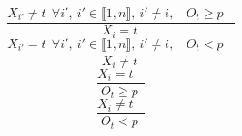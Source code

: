 $$\frac{X_{i'} \neq t~~\forall i',~i' \in \llbracket1,n\rrbracket,~i' \neq i,~~~~O_{t} \geq p~~~~}{X_{i}=t~}$$ $$\frac{X_{i'}=t~~\forall i',~i' \in \llbracket1,n\rrbracket,~i' \neq i,~~~~O_{t}<p~~~~}{X_{i} \neq t~}$$ $$\frac{X_{i}=t~~~~}{O_{t} \geq p~}$$ $$\frac{X_{i} \neq t~~~~}{O_{t}<p~}$$ 